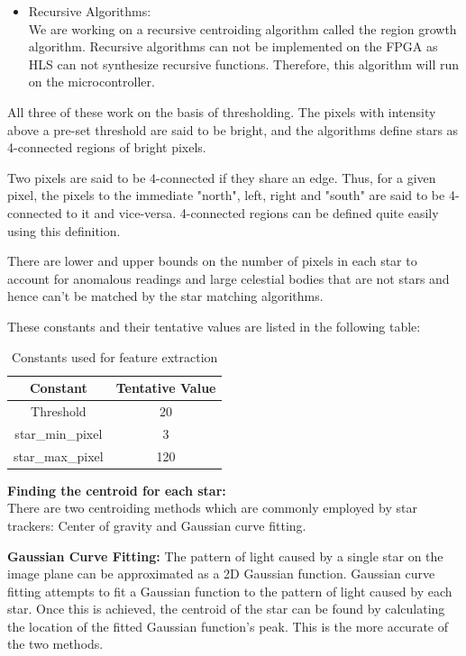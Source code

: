 \documentclass[../../main.tex]{subfiles}
\begin{document}
\begin{itemize}
\begin{itemize}
    \end{itemize}
    \item Recursive Algorithms:\\
    We are working on a recursive centroiding algorithm called the region growth algorithm. Recursive algorithms can not be implemented on the FPGA as HLS can not synthesize recursive functions. Therefore, this algorithm will run on the microcontroller.
\end{itemize}

All three of these work on the basis of thresholding. The pixels with intensity above a pre-set threshold are said to be bright, and the algorithms define stars as 4-connected regions of bright pixels. 

Two pixels are said to be 4-connected if they share an edge. Thus, for a given pixel, the pixels to the immediate "north", left, right and "south" are said to be 4-connected to it and vice-versa. 4-connected regions can be defined quite easily using this definition.

There are lower and upper bounds on the number of pixels in each star to account for anomalous readings and large celestial bodies that are not stars and hence can't be matched by the star matching algorithms.

These constants and their tentative values are listed in the following table:

\begin{table}[h]
    \centering
    \begin{tabular}{|c|c|}
        \hline
        \textbf{Constant} & \textbf{Tentative Value}\\
        \hline
        Threshold & 20\\
        star\_min\_pixel & 3 \\
        star\_max\_pixel & 120\\
        \hline
    \end{tabular}
    \caption{Constants used for feature extraction}
    \label{tab:fe_const}
\end{table}

\large{\textbf{Finding the centroid for each star:}}\\
\normalsize
There are two centroiding methods which are commonly employed by star trackers:
Center of gravity and Gaussian curve fitting.

\textbf{Gaussian Curve Fitting:}
The pattern of light caused by a single star on the image plane can be approximated as a 2D Gaussian function. Gaussian curve fitting attempts to fit a Gaussian function to the pattern of light caused by each star. Once this is achieved, the centroid of the star can be found by calculating the location of the fitted Gaussian function's peak. This is the more accurate of the two methods.
\end{document}
